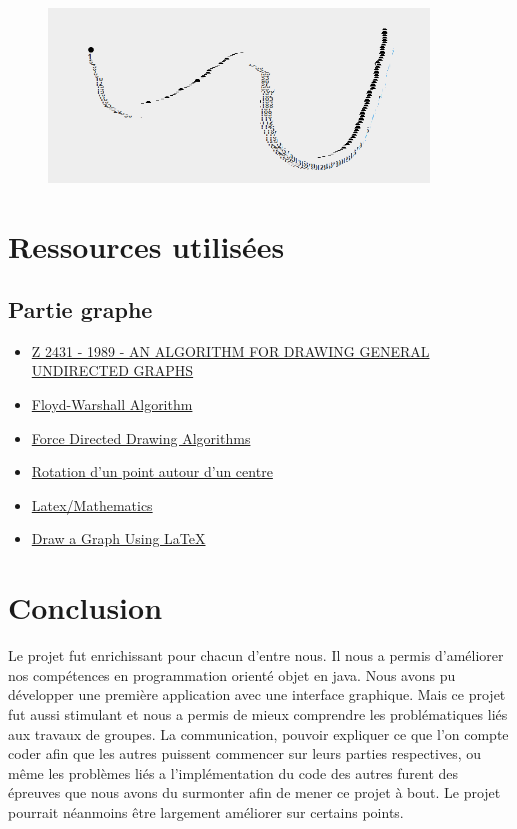 \documentclass[a4paper,12pt]{article}
\begin{document}
\begin {figure}[H]
    \centering
    \includegraphics[width=0.9\textwidth]{serpent.png}
\end {figure}

\section{Ressources utilisées}

\subsection{Partie graphe}

\begin{itemize}

  \item \href{http://asus.myds.me:6543/paper/ktall/Z\%202431\%20-\%201989\%20-\%20AN\%20ALGORITHM\%20FOR\%20DRAWING\%20GENERAL\%20UNDIRECTED\%20GRAPHS.pdf}{Z 2431 - 1989 - AN ALGORITHM FOR DRAWING GENERAL UNDIRECTED GRAPHS}
  \item \href{https://www.programiz.com/dsa/floyd-warshall-algorithm#:~:text=Floyd\%2DWarshall\%20Algorithm\%20is\%20an,in\%20a\%20cycle\%20is\%20negative}{Floyd-Warshall Algorithm}
  \item \href{https://cs.brown.edu/people/rtamassi/gdhandbook/chapters/force-directed.pdf}{Force Directed Drawing Algorithms}
  \item \href{https://www.stashofcode.fr/rotation-dun-point-autour-dun-centre/}{Rotation d'un point autour d'un centre}
  \item \href{https://en.wikibooks.org/wiki/LaTeX/Mathematics}{Latex/Mathematics}
  \item \href{https://www.baeldung.com/cs/latex-drawing-graphs}{Draw a Graph Using LaTeX}
\end{itemize}
\section{Conclusion}
Le projet fut enrichissant pour chacun d'entre nous. Il nous a permis d'améliorer nos compétences en programmation orienté objet en java. Nous avons pu développer une première application avec une interface graphique. Mais ce projet fut aussi stimulant et nous a permis de mieux comprendre les problématiques liés aux travaux de groupes. La communication, pouvoir expliquer ce que l'on compte coder afin que les autres puissent commencer sur leurs parties respectives, ou même les problèmes liés a l'implémentation du code des autres furent des épreuves que nous avons du surmonter afin de mener ce projet à bout. Le projet pourrait néanmoins être largement améliorer sur certains points. 
\end{document}
